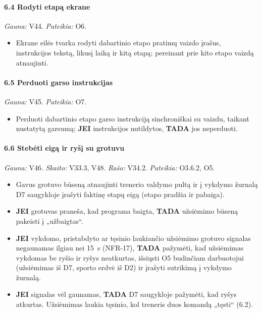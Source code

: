 \paragraph{6.4 Rodyti etapą ekrane}\mbox{}\par
{\small \textit{Gauna:} V44. \textit{Pateikia:} O6.}
\begin{itemize}
  \item Ekrane eilės tvarka rodyti dabartinio etapo pratimų vaizdo įrašus, instrukcijos tekstą, likusį laiką ir kitą etapą; pereinant prie kito etapo vaizdą atnaujinti.
\end{itemize}
\paragraph{6.5 Perduoti garso instrukcijas}\mbox{}\par
{\small \textit{Gauna:} V45. \textit{Pateikia:} O7.}
\begin{itemize}
  \item Perduoti dabartinio etapo garso instrukciją sinchroniškai su vaizdu, taikant nustatytą garsumą; \textbf{JEI} instrukcijos nutildytos, \textbf{TADA} jos neperduoti.
\end{itemize}
\paragraph{6.6 Stebėti eigą ir ryšį su grotuvu}\mbox{}\par
{\small \textit{Gauna:} V46. \textit{Skaito:} V33.3, V48. \textit{Rašo:} V34.2. \textit{Pateikia:} O3.6.2, O5.}
\begin{itemize}
  \item Gavus grotuvo būseną atnaujinti trenerio valdymo pultą ir į vykdymo žurnalą D7 saugykloje įrašyti faktinę etapų eigą (etapo pradžia ir pabaiga).
  \item \textbf{JEI} grotuvas praneša, kad programa baigta, \textbf{TADA} užsiėmimo būseną pakeisti į „užbaigtas“.
  \item \textbf{JEI} vykdomo, pristabdyto ar tęsinio laukiančio užsiėmimo grotuvo signalas negaunamas ilgiau nei 15~s (NFR-17), \textbf{TADA} pažymėti, kad užsiėmimas vykdomas be ryšio ir ryšys neatkurtas, išsiųsti O5 budinčiam darbuotojui (užsiėmimas iš D7, sporto erdvė iš D2) ir įrašyti sutrikimą į vykdymo žurnalą.
  \item \textbf{JEI} signalas vėl gaunamas, \textbf{TADA} D7 saugykloje pažymėti, kad ryšys atkurtas. Užsiėmimas laukia tęsinio, kol treneris duos komandą „tęsti“ (6.2).
\end{itemize}
